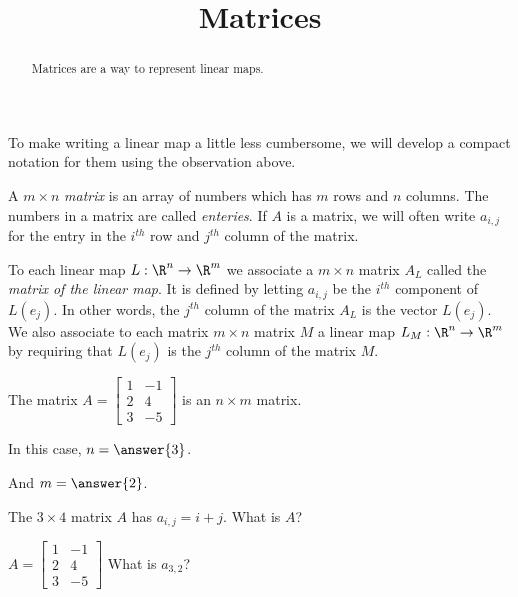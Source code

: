 \documentclass{ximera}
\title{Matrices}
\begin{document}
\begin{abstract}
  Matrices are a way to represent linear maps.
\end{abstract}

To make writing a linear map a little less cumbersome, we will develop a compact notation for them using the observation above. 
	
\begin{definition}
  A $m \times n$ \textit{matrix} is an array of numbers which has $m$ rows and $n$ columns.  The numbers in a matrix are called \textit{enteries}. If $A$ is a matrix, 
  we will often write $a_{i,j}$ for the entry in the $i^{th}$  row and $j^{th}$ column of the matrix.
\end{definition}

\begin{definition}
  To each linear map $L: \R^n \to \R^m$  we associate a $m \times n$ matrix $A_L$ called the \textit{matrix of the linear map}.  It is defined 
  by letting $a_{i,j}$ be the $i^{th}$ component of $L(e_j)$.  In other words, the $j^{th}$ column of the matrix $A_L$ is the vector $L(e_j)$.  We also associate to each 
  matrix $m \times n$ matrix $M$ a linear map $L_M: \R^n \to \R^m$ by requiring that $L(e_j)$ is the $j^{th}$ column of the matrix $M$. 
\end{definition}

\begin{question}
  The matrix $A = \begin{bmatrix}
    1&-1\\2&4\\3&-5
  \end{bmatrix}$
  is an $n \times m$ matrix.  

  \begin{solution}
    In this case, $n = \answer{3}$.

    And $m = \answer{2}$.
  \end{solution}
\end{question}
	
\begin{question}
  The $3 \times 4$ matrix $A$ has $a_{i,j} = i+j$.  What is $A$?
\end{question}

\begin{question}
  $A = \begin{bmatrix}
    1&-1\\2&4\\3&-5
  \end{bmatrix}$
  What is $a_{3,2}$?
\end{question}
\end{document}
